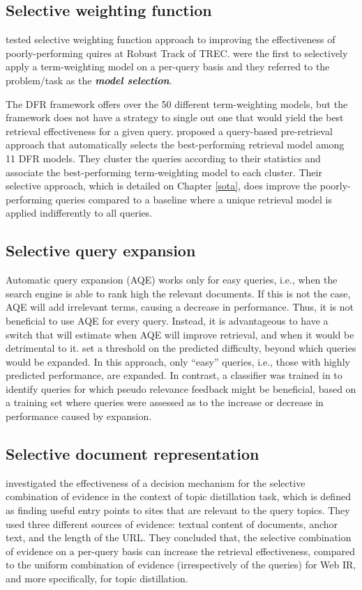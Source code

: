 \subsection{Selective weighting function}
\citet{uglasgow.robust} tested selective weighting function approach to improving the effectiveness of poorly-performing quires at Robust Track of TREC.
\citet{uglasgow.robust,ModelSelection} were the first to selectively apply a term-weighting model on a per-query basis and they referred to the problem/task as the \textbf{\emph{model selection}}.

The DFR framework offers over the 50 different term-weighting models, but the framework does not have a strategy to single out one that would yield the best retrieval effectiveness for a given query.
\citet{uglasgow.robust,ModelSelection} proposed a query-based pre-retrieval approach that automatically selects the best-performing retrieval model among 11 DFR models. 
They cluster the queries according to their statistics and associate the best-performing term-weighting model to each cluster. 
Their selective approach, which is detailed on Chapter \ref{sota}, does improve the poorly-performing queries compared to a baseline where a unique retrieval model is applied indifferently to all queries.

\subsection{Selective query expansion}
Automatic query expansion (AQE) works only for easy queries, i.e., when the search engine is able to rank high the relevant documents. 
If this is not the case, AQE will add irrelevant terms, causing a decrease in performance. Thus, it is not beneficial to use AQE for every query. 
Instead, it is advantageous to have a switch that will estimate when AQE will improve retrieval, and when it would be detrimental to it.
\citet*{Amati04querydifficulty} set a threshold on the predicted difficulty, beyond which queries would be expanded. 
In this approach, only ``easy'' queries, i.e., those with highly predicted performance, are expanded. 
In contrast, a classifier was trained in \citep{Yom05} to identify queries for which pseudo relevance feedback might be beneficial, based on a training set where queries were assessed as to the increase or decrease in performance caused by expansion.

\subsection{Selective document representation}
\citet{SelTopicDist,SelectiveTopicDistillation} investigated the effectiveness of a decision mechanism for the selective combination of evidence in the context of topic distillation task,
which is defined as finding useful entry points to sites that are relevant to the query topics.
They used three different sources of evidence: textual content of documents, anchor text, and the length of the URL.
They concluded that, the selective combination of evidence on a per-query basis can increase the retrieval effectiveness, compared to the uniform combination of evidence (irrespectively of the queries) for Web IR, and more specifically, for topic distillation.

